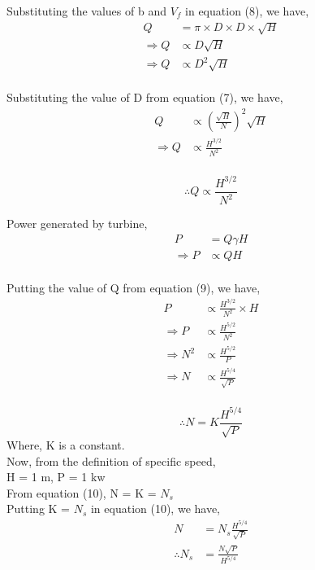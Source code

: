 \documentclass{article}
\begin{document}
\begin{multicols}{2}
      Substituting the values of b and $V_f$ in equation (8), we have,
      \begin{align*}
        Q &= \pi \times D \times D \times \sqrt{H} \\
        \Rightarrow Q &\propto D \sqrt{H} \\
        \Rightarrow Q &\propto D^2 \sqrt{H} \\
      \end{align*}

      Substituting the value of D from equation (7), we have,
      \begin{align*}
        Q &\propto \left(\frac{\sqrt{H}}{N}\right)^2 \sqrt{H} \\
        \Rightarrow Q &\propto \frac{H^{3/2}}{N^2} \\
      \end{align*}

      \begin{equation}
        \therefore Q \propto \frac{H^{3/2}}{N^2} 
      \end{equation}

      Power generated by turbine,
      \begin{align*}
        P &= Q \gamma H  \\
        \Rightarrow P &\propto Q H \\
      \end{align*}

      Putting the value of Q from equation (9), we have,
      \begin{align*}
        P &\propto \frac{H^{3/2}}{N^2} \times H \\
        \Rightarrow P &\propto \frac{H^{5/2}}{N^2} \\
        \Rightarrow N^2 &\propto \frac{H^{5/2}}{P} \\
        \Rightarrow N &\propto \frac{H^{5/4}}{\sqrt{P}} \\
      \end{align*}

      \begin{equation}
        \therefore N = K \frac{H^{5/4}}{\sqrt{P}}
      \end{equation}
      Where, K is a constant. \\

      Now, from the definition of specific speed,\\
      H = 1 m, P = 1 kw  \\

      From equation (10), N = K = $N_s$\\
      Putting K = $N_s$ in equation (10), we have,
      \begin{align*}
        N &= N_s \frac{H^{5/4}}{\sqrt{P}} \\
        \therefore N_s &= \frac{N \sqrt{P}}{H^{5/4}} \\
      \end{align*}

    \end{multicols}

    \hrulefill
\end{document}
